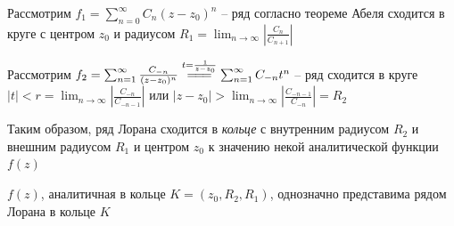 \documentclass[12pt]{article}
\begin{document}
Рассмотрим $f_1 = \sum_{n = 0}^\infty C_n (z - z_0)^n$ -- ряд согласно теореме Абеля сходится в круге с центром $z_0$ и радиусом $R_1 = \lim_{n \to \infty} \left|\frac{C_{n}}{C_{n+1}}\right|$

Рассмотрим $f_2 = \sum_{n = 1}^\infty \frac{C_{-n}}{(z - z_0)^n} \overset{t = \frac{1}{z - z_0}}{=\joinrel=\joinrel=} \sum_{n = 1}^\infty C_{-n} t^n$ -- ряд сходится в круге $|t| < r = \lim_{n \to \infty} \left|\frac{C_{-n}}{C_{-n-1}}\right|$ или $|z - z_0| > \lim_{n \to \infty} \left|\frac{C_{-n-1}}{C_{-n}}\right| = R_2$

Таким образом, ряд Лорана сходится в \textit{кольце} с внутренним радиусом $R_2$ и внешним радиусом $R_1$ и центром $z_0$ к значению некой аналитической функции $f(z)$


\begin{MyTheorem}
    $f(z)$, аналитичная в кольце $K = (z_0, R_2, R_1)$, однозначно представима рядом Лорана в кольце $K$
\end{MyTheorem}
\end{document}
